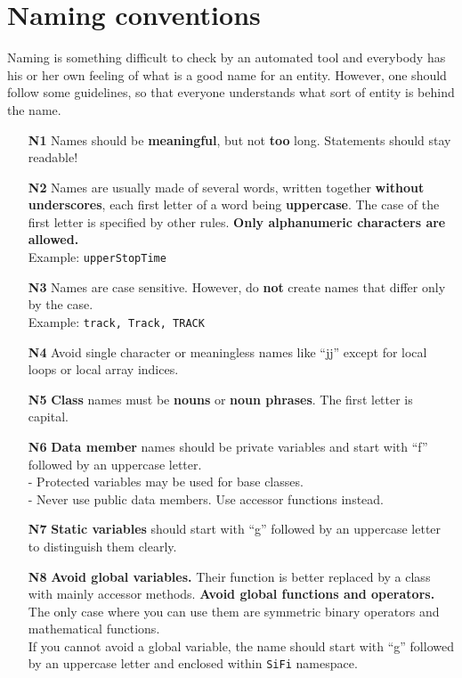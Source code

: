 \documentclass[a4paper,10pt]{article}
\begin{document}
\section{Naming conventions}

Naming is something difficult to check by an automated tool and everybody has
his or her own feeling of what is a good name for an entity. However, one
should follow some guidelines, so that everyone understands what sort of
entity is behind the name.

\begin{itemize}
\item[\bf N1] Names should be {\bf meaningful}, but not {\bf too} long.
  Statements should stay readable!
\item[\bf N2] Names are usually made of several words, written together
  {\bf without underscores}, each first letter of a word being {\bf uppercase}.
  The case of the first letter is specified by other rules. {\bf Only
  alphanumeric characters are allowed.}\\
  Example: {\tt upperStopTime}
\item[\bf N3] Names are case sensitive. However, do {\bf not} create names
  that differ only by the case.\\
  Example: {\tt track, Track, TRACK}
\item[\bf N4] Avoid single character or meaningless names like ``jj'' except
  for local loops or local array indices.
\item[\bf N5] {\bf Class} names must be {\bf nouns} or {\bf noun phrases}.
  The first letter is capital.
\item[\bf N6] {\bf Data member} names should be private variables and start
  with ``f'' followed by an uppercase letter.\\
  - Protected variables may be used for base classes.\\
  - Never use public data members. Use accessor functions instead.
\item[\bf N7] {\bf Static variables} should start with ``g'' followed by
  an uppercase letter to distinguish them clearly.
\item[\bf N8] {\bf Avoid global variables.} Their function is better
  replaced by a class with mainly accessor methods. {\bf Avoid global
  functions and operators.} The only case where you can use them are
  symmetric binary operators and mathematical functions.\\
  If you cannot avoid a global variable, the name should start with ``g''
  followed by an uppercase letter and enclosed within {\tt SiFi} namespace.

\end{itemize}
\end{document}

